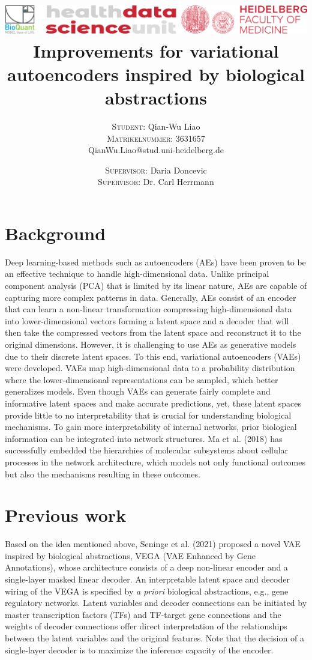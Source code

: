 \documentclass[12pt, a4paper]{article}
\title{
    \vspace{-24mm}
    \includegraphics[scale=1.04]{logo_hdsu.jpg}\\
    \vspace{6mm} \Large \bfseries Improvements for variational autoencoders inspired by biological abstractions
    }
\author{
    \hspace{-5mm} \small \textsc{Student:} Qian-Wu Liao\\
    \hspace{-5mm} \small \textsc{Matrikelnummer:} 3631657\\
    \hspace{-5mm} \small QianWu.Liao@stud.uni-heidelberg.de
    \and
    \hspace{2mm} \small \textsc{Supervisor:} Daria Doncevic\\
    \hspace{2mm} \small \textsc{Supervisor:} Dr. Carl Herrmann
    }
\date{}
\begin{document}
\maketitle
\vspace{-8mm}

\section*{\large Background}
Deep learning-based methods such as autoencoders (AEs) \cite{Hinton2006} have been proven to be an effective technique to handle high-dimensional data. Unlike principal component analysis (PCA) that is limited by its linear nature, AEs are capable of capturing more complex patterns in data. Generally, AEs consist of an encoder that can learn a non-linear transformation compressing high-dimensional data into lower-dimensional vectors forming a latent space and a decoder that will then take the compressed vectors from the latent space and reconstruct it to the original dimensions. However, it is challenging to use AEs as generative models due to their discrete latent spaces. To this end, variational autoencoders (VAEs) \cite{Kingma2014} were developed. VAEs map high-dimensional data to a probability distribution where the lower-dimensional representations can be sampled, which better generalizes models. Even though VAEs can generate fairly complete and informative latent spaces and make accurate predictions, yet, these latent spaces provide little to no interpretability that is crucial for understanding biological mechanisms. To gain more interpretability of internal networks, prior biological information can be integrated into network structures. Ma et al. (2018) has successfully embedded the hierarchies of molecular subsystems about cellular processes in the network architecture, which models not only functional outcomes but also the mechanisms resulting in these outcomes.

\section*{\large Previous work}
Based on the idea mentioned above, Seninge et al. (2021) proposed a novel VAE inspired by biological abstractions, VEGA (VAE Enhanced by Gene Annotations), whose architecture consists of a deep non-linear encoder and a single-layer masked linear decoder. An interpretable latent space and decoder wiring of the VEGA is specified by \textit{a priori} biological abstractions, e.g., gene regulatory networks. Latent variables and decoder connections can be initiated by master transcription factors (TFs) and TF-target gene connections and the weights of decoder connections offer direct interpretation of the relationships between the latent variables and the original features. Note that the decision of a single-layer decoder is to maximize the inference capacity of the encoder.
\end{document}
